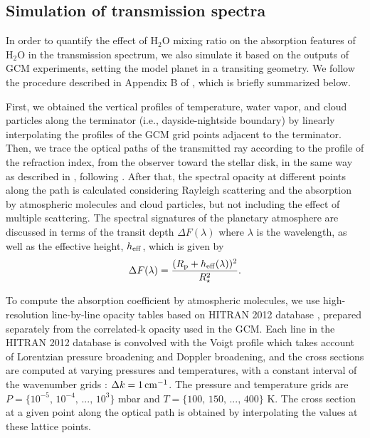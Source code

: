\documentclass[11pt,numberedappendix,twocolappendix,]{emulateapj}
\def\water{H$_2$O }
\begin{document}
\subsection{Simulation of transmission spectra}
\label{ss:method_TransmissionSpectra}

In order to quantify the effect of \water mixing ratio on the absorption features of \water in the transmission spectrum, 
we also simulate it based on the outputs of GCM experiments, setting the model planet in a transiting geometry. 
We follow the procedure described in Appendix B of \citet{Way2017}, which is briefly summarized below. 

First, we obtained the vertical profiles of temperature, water vapor, and cloud particles along the terminator (i.e., dayside-nightside boundary) by linearly interpolating the profiles of the GCM grid points adjacent to the terminator. 
Then, we trace the optical paths of the transmitted ray according to the profile of the refraction index, from the observer toward the stellar disk, in the same way as described in \citet{vanderWerf2008}, following \citet{Misra2014}. 
After that, the spectral opacity at different points along the path is calculated considering Rayleigh scattering and the absorption by atmospheric molecules and cloud particles, but not including the effect of multiple scattering. 
The spectral signatures of the planetary atmosphere are discussed in terms of the transit depth $\Delta F(\lambda )$ where $\lambda $ is the wavelength, as well as the effective height, $h_{\rm eff}$, which is given by
\begin{equation}
\Delta F(\lambda) = \frac{( R_{\rm p} + h_{\rm eff}(\lambda)  )^2}{R_{\star }^2}. 
\end{equation}

To compute the absorption coefficient by atmospheric molecules, we use high-resolution line-by-line opacity tables based on HITRAN 2012 database \citep{Rothman2013}, prepared separately from the correlated-k opacity used in the GCM. 
Each line in the HITRAN 2012 database is convolved with the Voigt profile which takes account of Lorentzian pressure broadening and Doppler broadening, 
and the cross sections are computed at varying pressures and temperatures, with a constant interval of the wavenumber grids : $\Delta k = 1\,{\rm cm}^{-1}$. 
The pressure and temperature grids are $P = \{10^{-5},\, 10^{-4},\,...,\,10^3\}$ mbar and $T = \{100,\, 150,\,...,\, 400\}$ K. 
The cross section at a given point along the optical path is obtained by interpolating the values at these lattice points. 
\end{document}
